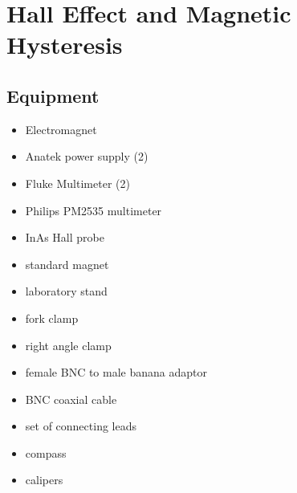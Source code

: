 




\chapter{Hall Effect and Magnetic Hysteresis}

\section{Equipment}

\begin{minipage}[t]{0.5\textwidth}
\begin{itemize}[noitemsep]
\item Electromagnet
\item Anatek power supply (2)
\item Fluke Multimeter (2)  %
\item Philips PM2535 multimeter
\item InAs Hall probe
\item standard magnet
\item laboratory stand
\item fork clamp
\end{itemize}
\end{minipage}
\begin{minipage}[t]{0.5\textwidth}
\begin{itemize}[noitemsep]
\item right angle clamp
\item female BNC to male banana adaptor
\item BNC coaxial cable
\item set of connecting leads
\item compass
\item calipers
\end{itemize}
\end{minipage}

